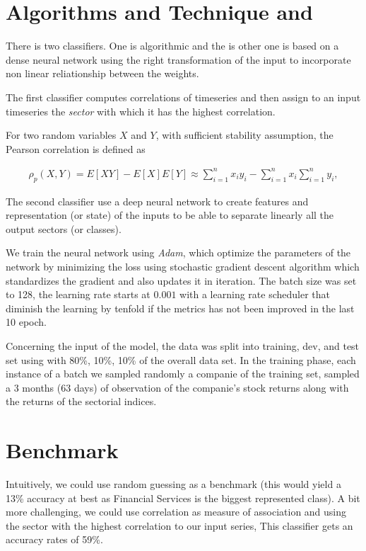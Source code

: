 \documentclass[a4paper,twoside]{article}
\begin{document}
\section{Algorithms and Technique and}
\label{sec:orgd0f2fb2}

There is two classifiers. One is algorithmic and the is other one is based on
a dense neural network using the right transformation of the input to
incorporate non linear reliationship between the weights.

The first classifier computes correlations of timeseries and then assign to an
input timeseries the \emph{sector} with which it has the highest correlation. 

For two random variables \(X\) and \(Y\), with sufficient stability assumption, the
Pearson correlation is defined as

\begin{align*}
  \rho_p(X, Y) = E[XY] - E[X]E[Y] \approx \sum_{i=1}^n x_iy_i - \sum_{i=1}^nx_i\sum_{i=1}^n y_i,
\end{align*}


The second classifier use a deep neural network to create features and
representation (or state) of the inputs to be able to separate linearly all
the output sectors (or classes).

We train the neural network using \emph{Adam}, which optimize the parameters of the
network by minimizing the loss using stochastic gradient descent algorithm
which standardizes the gradient and also updates it in iteration. The batch
size was set to 128, the learning rate starts at \(0.001\) with a learning rate
scheduler that diminish the learning by tenfold if the metrics has not been
improved in the last 10 epoch.

Concerning the input of the model, the data was split into training, dev, and
test set using with 80\%, 10\%, 10\% of the overall data set. In the training
phase, each instance of a batch we sampled randomly a companie of the training
set, sampled a 3 months (63 days) of observation of the companie's stock
returns along with the returns of the sectorial indices.

\section{Benchmark}
\label{sec:orgee61770}

Intuitively, we could use random guessing as a benchmark (this would yield a
13\% accuracy at best as Financial Services is the biggest represented class).
A bit more challenging, we could use correlation as measure of association and
using the sector with the highest correlation to our input series, This
classifier gets an accuracy rates of 59\%.
\end{document}
